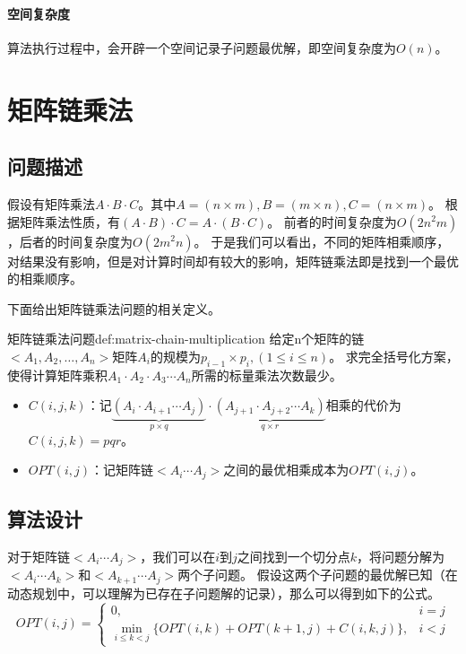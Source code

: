 \paragraph*{空间复杂度}
算法执行过程中，会开辟一个空间记录子问题最优解，即空间复杂度为$O(n)$。

\section{矩阵链乘法}\label{sec:matrix-chain-multiplication}

\subsection{问题描述}
假设有矩阵乘法$A \cdot B \cdot C$。其中$A = (n \times m), B = (m \times n), C = (n \times m)$。
根据矩阵乘法性质，有$(A \cdot B) \cdot C = A \cdot (B \cdot C)$。
前者的时间复杂度为$O(2n^2m)$，后者的时间复杂度为$O(2m^2n)$。
于是我们可以看出，不同的矩阵相乘顺序，对结果没有影响，但是对计算时间却有较大的影响，矩阵链乘法即是找到一个最优的相乘顺序。
\par
下面给出矩阵链乘法问题的相关定义。
\begin{definition}{矩阵链乘法问题}{def:matrix-chain-multiplication}
  给定n个矩阵的链$<A_1,A_2,\ldots,A_n>$矩阵$A_i$的规模为$p_{i-1} \times p_i, (1 \leq i \leq n)$。
  求完全括号化方案，使得计算矩阵乘积$A_1 \cdot A_2 \cdot A_3 \cdots A_n$所需的标量乘法次数最少。
  \begin{itemize}
    \item $C(i,j,k)$：记$\underbrace{(A_i \cdot A_{i+1} \cdots A_j)}_{p \times q}  \cdot \underbrace{(A_{j+1} \cdot A_{j+2} \cdots A_k)}_{q \times r}$相乘的代价为$C(i,j,k)=pqr$。
    \item $OPT(i,j)$：记矩阵链$<A_i \cdots A_j>$之间的最优相乘成本为$OPT(i,j)$。
  \end{itemize}
\end{definition}

\subsection{算法设计}
对于矩阵链$<A_i \cdots A_j>$，我们可以在$i$到$j$之间找到一个切分点$k$，将问题分解为$<A_i \cdots A_k>$和$<A_{k+1} \cdots A_j>$两个子问题。
假设这两个子问题的最优解已知（在动态规划中，可以理解为已存在子问题解的记录），那么可以得到如下的公式。
\begin{equation}
  OPT(i,j) = \begin{cases}
    0,                                                            & i = j \\
    \min\limits_{i \leq k < j} \{ OPT(i,k)+OPT(k+1,j)+C(i,k,j)\}, & i < j
  \end{cases}
\end{equation}

